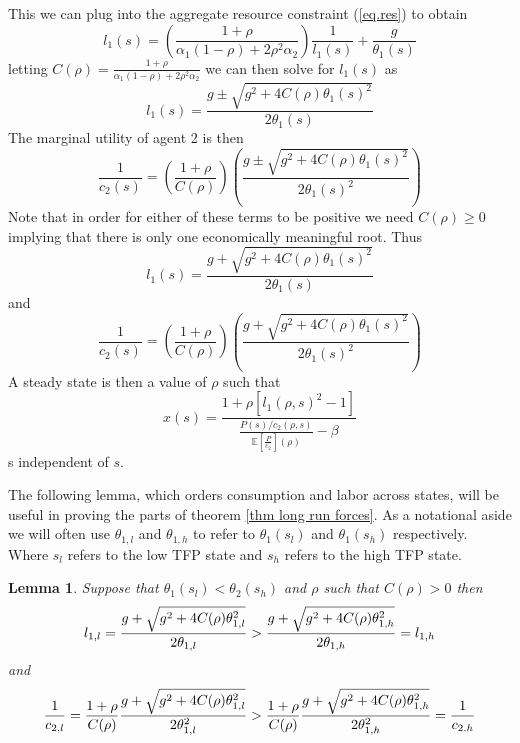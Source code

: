 \documentclass[thmsb,11pt]{article}
\newtheorem{lemma}{Lemma}
\begin{document}
This we can plug into the aggregate resource constraint (\ref{eq.res}) to
obtain
\begin{equation*}
l_1(s) = \left(\frac{1+\rho}{\alpha_1(1-\rho)+2\rho^2\alpha_2}\right)\frac{1}{l_1(s)} +
\frac{g}{\theta_1(s)}
\end{equation*}%
letting $C(\rho) = \frac{1+\rho}{\alpha_1(1-\rho)+2\rho^2\alpha_2}$ we can
then solve for $l_1(s)$ as
\begin{equation*}
l_1(s) = \frac{g\pm\sqrt{g^2+4C(\rho)\theta_1(s)^2}}{2\theta_1(s)}
\end{equation*}
The marginal utility of agent 2 is then
\begin{equation*}
\frac1{c_2(s)} = \left(\frac{1+\rho}{C(\rho)}\right)\left(\frac{g\pm\sqrt{g^2+4C(\rho)%
\theta_1(s)^2}}{2\theta_1(s)^2}\right)
\end{equation*}%
Note that in order for either of these terms to be positive we need $%
C(\rho)\geq 0$ implying that there is only one economically meaningful root.
Thus
\begin{equation}
l_1(s) = \frac{g+\sqrt{g^2+4C(\rho)\theta_1(s)^2}}{2\theta_1(s)}
\end{equation}
and
\begin{equation}
\frac1{c_2(s)} = \left(\frac{1+\rho}{C(\rho)}\right)\left(\frac{g+\sqrt{g^2+4C(\rho)%
\theta_1(s)^2}}{2\theta_1(s)^2} \right) \label{eq.uc2}
\end{equation}
A steady state is then a value of $\rho$ such that
\begin{equation}
x(s) = \frac{1+\rho[l_1(\rho,s)^2-1]}{\frac{P(s)/c_2(\rho,s)}{\mathbb{E}%
[\frac{P}{c_2}](\rho)}-\beta}  \label{eq.xSS}
\end{equation}%
s independent of $s$.

The following lemma, which orders consumption and labor across states, will
be useful in proving the parts of theorem \ref{thm long run forces}.  As a notational aside we
will often use $\theta_{1,l}$ and $\theta_{1,h}$ to refer to $%
\theta_{1}(s_l) $ and $\theta_{1}(s_h)$ respectively. Where $s_l$ refers to
the low TFP state and $s_h$ refers to the high TFP state.

\begin{lemma}
Suppose that $\theta_1(s_l) < \theta_2(s_h)$ and $\rho$ such that $C(\rho) >
0$ then
\begin{equation*}
l_{1,l} = \frac{g+\sqrt{g^2+4C(\rho)\theta_{1,l}^2}}{2\theta_{1,l}} > \frac{%
g+\sqrt{g^2+4C(\rho)\theta_{1,h}^2}}{2\theta_{1,h}} = l_{1,h}
\end{equation*}
and
\begin{equation*}
\frac1{c_{2,l}} = \frac{1+\rho}{C(\rho)}\frac{g+\sqrt{g^2+4C(\rho)%
\theta_{1,l}^2}}{2\theta_{1,l}^2} > \frac{1+\rho}{C(\rho)}\frac{g+\sqrt{%
g^2+4C(\rho)\theta_{1,h}^2}}{2\theta_{1,h}^2} = \frac1{c_{2.h}}
\end{equation*}%
\label{lem.1}
\end{lemma}
\end{document}
